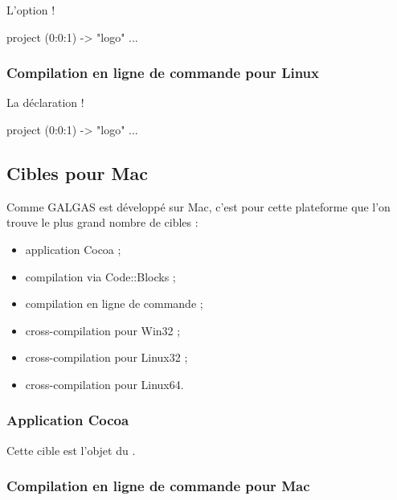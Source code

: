 L'option \ggs!%
\begin{galgas}
project (0:0:1) -> "logo" {
  ...
}
\end{galgas}

\subsubsection{Compilation en ligne de commande pour Linux}

La déclaration \ggs!%
\begin{galgas}
project (0:0:1) -> "logo" {
  ...
}
\end{galgas}



\subsection{Cibles pour Mac}

Comme GALGAS est développé sur Mac, c'est pour cette plateforme que l'on trouve le plus grand nombre de cibles :
\begin{itemize}
  \item application Cocoa ;
  \item compilation via Code::Blocks ;
  \item compilation en ligne de commande ;
  \item cross-compilation pour Win32 ;
  \item cross-compilation pour Linux32 ;
  \item cross-compilation pour Linux64.
\end{itemize}

\subsubsection{Application Cocoa}

Cette cible est l'objet du .

\subsubsection{Compilation en ligne de commande pour Mac}

